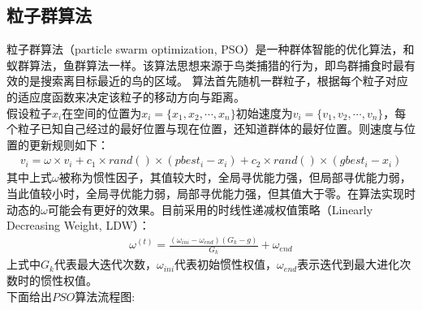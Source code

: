 \subsection{粒子群算法}
粒子群算法（particle swarm optimization, PSO）是一种群体智能的优化算法，和蚁群算法，鱼群算法一样。该算法思想来源于鸟类捕猎的行为，即鸟群捕食时最有效的是搜索离目标最近的鸟的区域。
算法首先随机一群粒子，根据每个粒子对应的适应度函数来决定该粒子的移动方向与距离。\\
假设粒子$x_i$在空间的位置为$x_i = \{x_1,x_2,\cdots, x_n\}$初始速度为$v_i = \{v_1,v_2,\cdots, v_n\}$，每个粒子已知自己经过的最好位置与现在位置，还知道群体的最好位置。则速度与位置的更新规则如下：
\begin{align}
    v_i = \omega \times v_i + c_1 \times rand() \times (pbest_i - x_i) + c_2 \times rand() \times (gbest_i - x_i)
\end{align}
其中上式$\omega$被称为惯性因子，其值较大时，全局寻优能力强，但局部寻优能力弱，当此值较小时，全局寻优能力弱，局部寻优能力强，但其值大于零。在算法实现时动态的$\omega$可能会有更好的效果。目前采用的时线性递减权值策略（Linearly Decreasing Weight, LDW）：
\begin{align}
    \omega^{(t)} = \frac{(\omega_{ini} - \omega_{end})(G_k - g)}{G_k} + \omega_{end}
\end{align}
上式中$G_k$代表最大迭代次数，$\omega_{ini}$代表初始惯性权值，$\omega_{end}$表示迭代到最大进化次数时的惯性权值。\\
下面给出$PSO$算法流程图:
